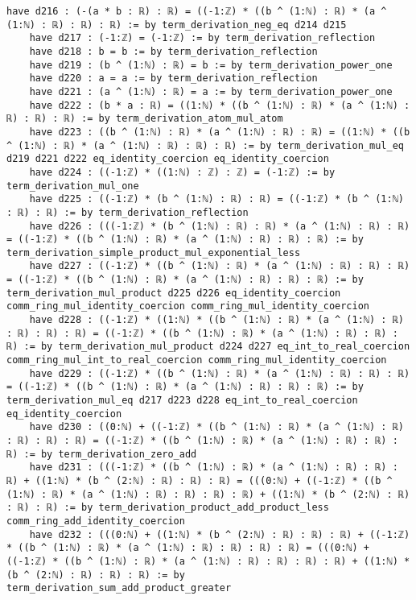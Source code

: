 \documentclass{article}
\begin{document}
\begin{tcolorbox}[colback=white!10, width=\linewidth]
\begin{lstlisting}[language=Lean4]
    have d216 : (-(a * b : ℝ) : ℝ) = ((-1:ℤ) * ((b ^ (1:ℕ) : ℝ) * (a ^ (1:ℕ) : ℝ) : ℝ) : ℝ) := by term_derivation_neg_eq d214 d215
    have d217 : (-1:ℤ) = (-1:ℤ) := by term_derivation_reflection
    have d218 : b = b := by term_derivation_reflection
    have d219 : (b ^ (1:ℕ) : ℝ) = b := by term_derivation_power_one
    have d220 : a = a := by term_derivation_reflection
    have d221 : (a ^ (1:ℕ) : ℝ) = a := by term_derivation_power_one
    have d222 : (b * a : ℝ) = ((1:ℕ) * ((b ^ (1:ℕ) : ℝ) * (a ^ (1:ℕ) : ℝ) : ℝ) : ℝ) := by term_derivation_atom_mul_atom
    have d223 : ((b ^ (1:ℕ) : ℝ) * (a ^ (1:ℕ) : ℝ) : ℝ) = ((1:ℕ) * ((b ^ (1:ℕ) : ℝ) * (a ^ (1:ℕ) : ℝ) : ℝ) : ℝ) := by term_derivation_mul_eq d219 d221 d222 eq_identity_coercion eq_identity_coercion
    have d224 : ((-1:ℤ) * ((1:ℕ) : ℤ) : ℤ) = (-1:ℤ) := by term_derivation_mul_one
    have d225 : ((-1:ℤ) * (b ^ (1:ℕ) : ℝ) : ℝ) = ((-1:ℤ) * (b ^ (1:ℕ) : ℝ) : ℝ) := by term_derivation_reflection
    have d226 : (((-1:ℤ) * (b ^ (1:ℕ) : ℝ) : ℝ) * (a ^ (1:ℕ) : ℝ) : ℝ) = ((-1:ℤ) * ((b ^ (1:ℕ) : ℝ) * (a ^ (1:ℕ) : ℝ) : ℝ) : ℝ) := by term_derivation_simple_product_mul_exponential_less
    have d227 : ((-1:ℤ) * ((b ^ (1:ℕ) : ℝ) * (a ^ (1:ℕ) : ℝ) : ℝ) : ℝ) = ((-1:ℤ) * ((b ^ (1:ℕ) : ℝ) * (a ^ (1:ℕ) : ℝ) : ℝ) : ℝ) := by term_derivation_mul_product d225 d226 eq_identity_coercion comm_ring_mul_identity_coercion comm_ring_mul_identity_coercion
    have d228 : ((-1:ℤ) * ((1:ℕ) * ((b ^ (1:ℕ) : ℝ) * (a ^ (1:ℕ) : ℝ) : ℝ) : ℝ) : ℝ) = ((-1:ℤ) * ((b ^ (1:ℕ) : ℝ) * (a ^ (1:ℕ) : ℝ) : ℝ) : ℝ) := by term_derivation_mul_product d224 d227 eq_int_to_real_coercion comm_ring_mul_int_to_real_coercion comm_ring_mul_identity_coercion
    have d229 : ((-1:ℤ) * ((b ^ (1:ℕ) : ℝ) * (a ^ (1:ℕ) : ℝ) : ℝ) : ℝ) = ((-1:ℤ) * ((b ^ (1:ℕ) : ℝ) * (a ^ (1:ℕ) : ℝ) : ℝ) : ℝ) := by term_derivation_mul_eq d217 d223 d228 eq_int_to_real_coercion eq_identity_coercion
    have d230 : ((0:ℕ) + ((-1:ℤ) * ((b ^ (1:ℕ) : ℝ) * (a ^ (1:ℕ) : ℝ) : ℝ) : ℝ) : ℝ) = ((-1:ℤ) * ((b ^ (1:ℕ) : ℝ) * (a ^ (1:ℕ) : ℝ) : ℝ) : ℝ) := by term_derivation_zero_add
    have d231 : (((-1:ℤ) * ((b ^ (1:ℕ) : ℝ) * (a ^ (1:ℕ) : ℝ) : ℝ) : ℝ) + ((1:ℕ) * (b ^ (2:ℕ) : ℝ) : ℝ) : ℝ) = (((0:ℕ) + ((-1:ℤ) * ((b ^ (1:ℕ) : ℝ) * (a ^ (1:ℕ) : ℝ) : ℝ) : ℝ) : ℝ) + ((1:ℕ) * (b ^ (2:ℕ) : ℝ) : ℝ) : ℝ) := by term_derivation_product_add_product_less comm_ring_add_identity_coercion
    have d232 : (((0:ℕ) + ((1:ℕ) * (b ^ (2:ℕ) : ℝ) : ℝ) : ℝ) + ((-1:ℤ) * ((b ^ (1:ℕ) : ℝ) * (a ^ (1:ℕ) : ℝ) : ℝ) : ℝ) : ℝ) = (((0:ℕ) + ((-1:ℤ) * ((b ^ (1:ℕ) : ℝ) * (a ^ (1:ℕ) : ℝ) : ℝ) : ℝ) : ℝ) + ((1:ℕ) * (b ^ (2:ℕ) : ℝ) : ℝ) : ℝ) := by term_derivation_sum_add_product_greater

\end{lstlisting}
\end{tcolorbox}
\end{document}
